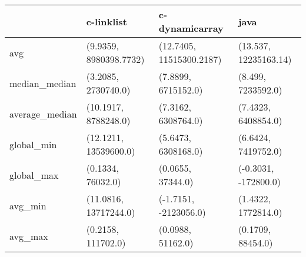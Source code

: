 \begin{tabular}{llll}
\toprule
{} &              c-linklist &            c-dynamicarray &                   java \\
\midrule
avg            &  (9.9359, 8980398.7732) &  (12.7405, 11515300.2187) &  (13.537, 12235163.14) \\
median\_median  &     (3.2085, 2730740.0) &       (7.8899, 6715152.0) &     (8.499, 7233592.0) \\
average\_median &    (10.1917, 8788248.0) &       (7.3162, 6308764.0) &    (7.4323, 6408854.0) \\
global\_min     &   (12.1211, 13539600.0) &       (5.6473, 6308168.0) &    (6.6424, 7419752.0) \\
global\_max     &       (0.1334, 76032.0) &         (0.0655, 37344.0) &   (-0.3031, -172800.0) \\
avg\_min        &   (11.0816, 13717244.0) &     (-1.7151, -2123056.0) &    (1.4322, 1772814.0) \\
avg\_max        &      (0.2158, 111702.0) &         (0.0988, 51162.0) &      (0.1709, 88454.0) \\
\bottomrule
\end{tabular}
